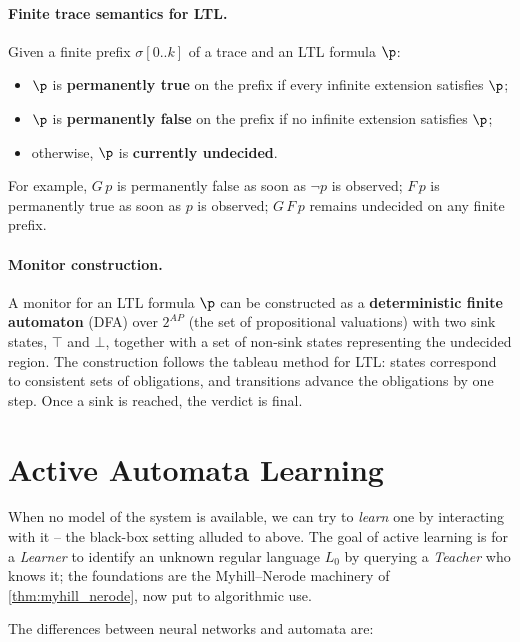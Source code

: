 \documentclass[oneside]{academica}
\begin{document}
\paragraph{Finite trace semantics for LTL.}
Given a finite prefix $\sigma[0..k]$ of a trace and an LTL formula $\p$:
\begin{itemize}
  \item $\p$ is \textbf{permanently true} on the prefix if every infinite extension satisfies $\p$;
  \item $\p$ is \textbf{permanently false} on the prefix if no infinite extension satisfies $\p$;
  \item otherwise, $\p$ is \textbf{currently undecided}.
\end{itemize}
For example, $G\,p$ is permanently false as soon as $\neg p$ is observed; $F\,p$ is permanently true as soon as $p$ is observed; $G\,F\,p$ remains undecided on any finite prefix.

\paragraph{Monitor construction.}
A monitor for an LTL formula $\p$ can be constructed as a \textbf{deterministic finite automaton} (DFA) over $2^{AP}$ (the set of propositional valuations) with two sink states, $\top$ and $\bot$, together with a set of non-sink states representing the undecided region. The construction follows the tableau method for LTL: states correspond to consistent sets of obligations, and transitions advance the obligations by one step. Once a sink is reached, the verdict is final.

\section{Active Automata Learning}\label{sec:learning-automata}

When no model of the system is available, we can try to \emph{learn} one by interacting with it -- the black-box setting alluded to above. The goal of active learning is for a \emph{Learner} to identify an unknown regular language $L_0$ by querying a \emph{Teacher} who knows it; the foundations are the Myhill--Nerode machinery of \autoref{thm:myhill_nerode}, now put to algorithmic use.

The differences between neural networks and automata are:
\end{document}
